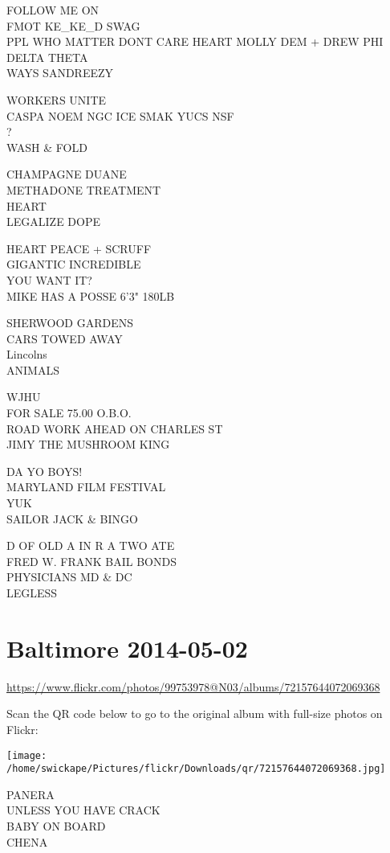 \documentclass[10pt,letterpaper]{article}
\begin{document}
FOLLOW ME ON\\
FMOT KE\_KE\_D SWAG\\
PPL WHO MATTER DONT CARE HEART MOLLY DEM + DREW PHI DELTA THETA\\
WAYS SANDREEZY

WORKERS UNITE\\
CASPA NOEM NGC ICE SMAK YUCS NSF\\
?\\
WASH \& FOLD

CHAMPAGNE DUANE\\
METHADONE TREATMENT\\
HEART\\
LEGALIZE DOPE

HEART PEACE + SCRUFF\\
GIGANTIC INCREDIBLE\\
YOU WANT IT?\\
MIKE HAS A POSSE 6'3" 180LB

SHERWOOD GARDENS\\
CARS TOWED AWAY\\
Lincolns\\
ANIMALS

WJHU\\
FOR SALE 75.00 O.B.O.\\
ROAD WORK AHEAD ON CHARLES ST\\
JIMY THE MUSHROOM KING

DA YO BOYS!\\
MARYLAND FILM FESTIVAL\\
YUK\\
SAILOR JACK \& BINGO

D OF OLD A IN R A TWO ATE\\
FRED W. FRANK BAIL BONDS\\
PHYSICIANS MD \& DC\\
LEGLESS


\section*{Baltimore 2014-05-02}

\url{https://www.flickr.com/photos/99753978@N03/albums/72157644072069368}

Scan the QR code below to go to the original album with full-size photos on Flickr:

\texttt{[image: /home/swickape/Pictures/flickr/Downloads/qr/72157644072069368.jpg]}


PANERA\\
UNLESS YOU HAVE CRACK\\
BABY ON BOARD\\
CHENA
\end{document}
